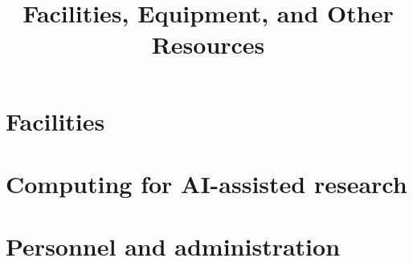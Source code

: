 \documentclass[11pt]{amsart}
\title{Facilities, Equipment, and Other Resources}
\begin{document}
\maketitle
\vspace{-0.9cm}

\section*{Facilities}

\section*{Computing for AI-assisted research}

\section*{Personnel and administration}
\end{document}
